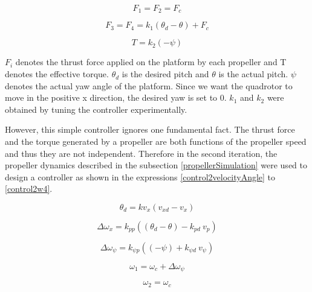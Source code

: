 \documentclass[12pt,a4paper]{report}
\begin{document}
\begin{equation}
\label{control1Motor1Force}
F_{1} = F_{2} = F_{c}
\end{equation}

\begin{equation}
\label{control1Motor3Force}
F_{3} = F_{4} = k_{1}(\theta_{d} - \theta) + F_{c}
\end{equation}

\begin{equation}
\label{control1torque}
T = k_{2}(-\psi)
\end{equation}

\(F_{i}\) denotes the thrust force applied on the platform by each propeller and T denotes the effective torque. \(\theta_{d}\) is the desired pitch and \(\theta\) is the actual pitch. \(\psi\) denotes the actual yaw angle of the platform. Since we want the quadrotor to move in the positive x direction, the desired yaw is set to 0. \(k_{1}\) and \(k_{2}\) were obtained by tuning the controller experimentally. 

However, this simple controller ignores one fundamental fact. The thrust force and the torque generated by a propeller are both functions of the propeller speed and thus they are not independent. Therefore in the second iteration, the propeller dynamics described in the subsection \ref{propellerSimulation} were used to design a controller as shown in the expressions \ref{control2velocityAngle} to \ref{control2w4}. 

\begin{equation}
\label{control2velocityAngle}
\theta_{d} = kv_{x}(v_{xd} - v_{x})
\end{equation}

\begin{equation}
\label{control2velocityRotation}
\Delta\omega_{x} = k_{pp}((\theta_{d} - \theta) - k_{pd}\ v_{p})
\end{equation}

\begin{equation}
\label{control2yaw}
\Delta\omega_{\psi} = k_{\psi p}((-\psi) + k_{\psi d}\ v_{\psi})
\end{equation}

\begin{equation}
\label{control2w1}
\omega_{1} = \omega_{c} + \Delta\omega_{\psi}
\end{equation}

\begin{equation}
\label{control2w2}
\omega_{2} = \omega_{c}
\end{equation}
\end{document}
